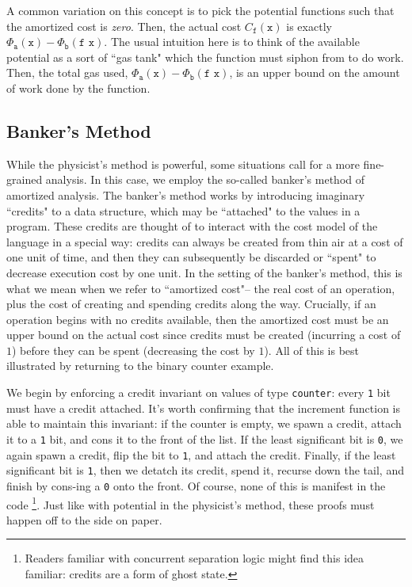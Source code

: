 \documentclass[draft]{westhesis}
\begin{document}
A common variation on this concept is to pick the potential functions such that the amortized cost is \textit{zero}. Then, the actual cost $C_\texttt{f}(\texttt{x})$ is exactly $\Phi_\texttt{a}(\texttt{x}) - \Phi_\texttt{b}(\texttt{f x})$. The usual intuition here is to think of the available potential as a sort of ``gas tank" which the function must siphon from to do work. Then, the total gas used, $\Phi_\texttt{a}(\texttt{x}) - \Phi_\texttt{b}(\texttt{f x})$, is an upper bound on the amount of work done by the function.


\subsection{Banker's Method}
While the physicist's method is powerful, some situations call for a more fine-grained analysis. In this case, we employ the so-called banker's method of amortized analysis. The banker's method works by introducing imaginary ``credits" to a data structure, which may be ``attached" to the values in a program. These credits are thought of to interact with the cost model of the language in a special way: credits can always be created from thin air at a cost of one unit of time, and then they can subsequently be discarded or ``spent" to decrease execution cost by one unit. In the setting of the banker's method, this is what we mean when we refer to ``amortized cost"-- the real cost of an operation, plus the cost of creating and spending credits along the way. Crucially, if an operation begins with no credits available, then the amortized cost must be an upper bound on the actual cost since credits must be created (incurring a cost of $1$) before they can be spent (decreasing the cost by $1$). All of this is best illustrated by returning to the binary counter example.

We begin by enforcing a credit invariant on values of type \texttt{counter}: every \texttt{1} bit must have a credit attached. It's worth confirming that the increment function is able to maintain this invariant: if the counter is empty, we spawn a credit, attach it to a \texttt{1} bit, and cons it to the front of the list.
If the least significant bit is \texttt{0}, we again spawn a credit, flip the bit to \texttt{1}, and attach the credit. Finally, if the least significant bit is \texttt{1}, then we detatch its credit, spend it, recurse down the tail, and finish by cons-ing a \texttt{0} onto the front. Of course, none of this is manifest in the code
\footnote{
Readers familiar with concurrent separation logic might find this idea familiar: credits are a form of ghost state.
}.
Just like with potential in the physicist's method, these proofs must happen off to the side on paper.
\end{document}
